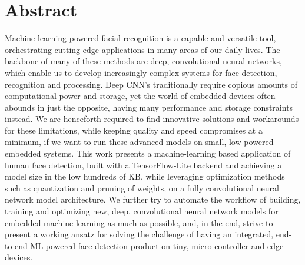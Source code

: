 \section*{Abstract}

Machine learning powered facial recognition is a capable and versatile  tool, orchestrating cutting-edge applications in many areas of our daily lives. The backbone of many of these methods are deep, convolutional neural networks, which enable us to develop increasingly complex systems for face detection, recognition and processing. Deep CNN's traditionally require copious amounts of computational power and storage, yet the world of embedded devices often abounds in just the opposite, having many performance and storage constraints instead. We are henceforth required to find innovative solutions and workarounds for these limitations, while keeping quality and speed compromises at a minimum, if we want to run these advanced models on small, low-powered embedded systems. This work presents a machine-learning based application of human face detection, built with a TensorFlow-Lite backend and achieving a model size in the low hundreds of KB, while leveraging optimization methods such as quantization and pruning of weights, on a fully convolutional neural network model architecture. We further try to automate the workflow of building, training and optimizing new, deep, convolutional neural network models for embedded machine learning as much as possible, and, in the end, strive to present a working ansatz for solving the challenge of having an integrated, end-to-end ML-powered face detection product on tiny, micro-controller and edge devices.
